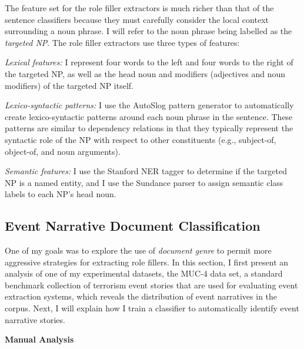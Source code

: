 The feature set for the role filler extractors is much richer than that of
the sentence classifiers because they must carefully consider the
local context surrounding a noun phrase. 
I will refer to the noun phrase being labelled as the {\it targeted NP}. The role filler extractors use three types of features:

{\it Lexical features:} I represent four words to the left and four
words to the right of the targeted NP, as well as the head noun 
and modifiers (adjectives and noun modifiers) of the targeted NP itself.

{\it Lexico-syntactic patterns:} I use the AutoSlog pattern generator
\cite{autoslog-aaai93} to automatically create lexico-syntactic patterns
around each noun phrase in the sentence. These patterns are similar to
dependency relations in that they typically represent the syntactic
role of the NP with respect to other constituents (e.g., subject-of,
object-of, and noun arguments). 

{\it Semantic features:} I use the Stanford NER tagger
\cite{Finkel05} to determine if the targeted NP is a named entity, and
I use the Sundance parser
 \cite{riloff-sundance04}
to assign semantic class labels to each NP's head noun.

\subsection{Event Narrative Document Classification}
\label{doc-section}

One of my goals was to explore the use of {\it document genre} to
permit more aggressive strategies for extracting role fillers. 
In this section, I first present an analysis of one of my experimental datasets, the
MUC-4 data set, a standard benchmark collection of terrorism event stories 
that are used for evaluating event extraction systems, which reveals the distribution of event narratives in
the corpus. Next, I will explain how I train a classifier to
automatically identify event narrative stories.

\vspace{.1in}
{\bf Manual Analysis}
\vspace{.1in}

